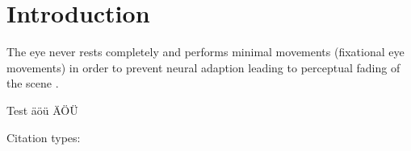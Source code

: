 \chapter{Introduction}
\label{chap:introduction}
The eye never rests completely and performs minimal movements (fixational eye movements) in order to prevent neural adaption leading to perceptual fading of the scene \cite{Martinez-Conde2013}.

Test äöü ÄÖÜ

Citation types:

\cite{Martinez-Conde2013}


